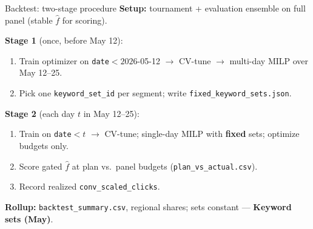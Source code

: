 \documentclass[11pt]{beamer}
\begin{document}
\begin{frame}{Backtest: two-stage procedure}
  \footnotesize
  \textbf{Setup:} tournament + evaluation ensemble on full panel (stable $\hat f$ for scoring).

  \vspace{0.2em}
  \textbf{Stage 1} (once, before May 12):
  \begin{enumerate}
    \item Train optimizer on \texttt{date}${<}2026$-05-12 $\rightarrow$ CV-tune $\rightarrow$ multi-day MILP over May 12--25.
    \item Pick one \texttt{keyword\_set\_id} per segment; write \texttt{fixed\_keyword\_sets.json}.
  \end{enumerate}

  \vspace{0.15em}
  \textbf{Stage 2} (each day $t$ in May 12--25):
  \begin{enumerate}
    \item Train on \texttt{date}${<}t$ $\rightarrow$ CV-tune; single-day MILP with \textbf{fixed} sets; optimize budgets only.
    \item Score gated $\hat f$ at plan vs.\ panel budgets (\texttt{plan\_vs\_actual.csv}).
    \item Record realized \texttt{conv\_scaled\_clicks}.
  \end{enumerate}

  \vspace{0.15em}
  \textbf{Rollup:} \texttt{backtest\_summary.csv}, regional shares; sets constant --- \textbf{Keyword sets (May)}.
  \normalsize
\end{frame}
\end{document}
